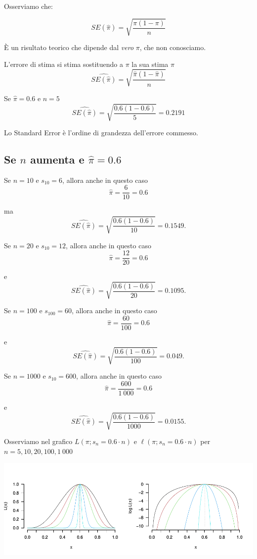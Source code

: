 \documentclass[
  11pt,
]{book}
\theoremstyle{mytheoremstyle}
\theoremstyle{mydefstyle}
\newenvironment{nota}
  {
\begin{tcolorbox}[enhanced,breakable,arc=0.1mm,boxrule=1pt,colback=white,colframe=iblue,title=\bf \fontfamily{lmss}\selectfont \faInfoCircle \hspace{.5 cm} Nota,drop fuzzy shadow]
}{
\end{tcolorbox}
  }
\begin{document}
Osserviamo che:

\begin{info}
\[SE(\hat\pi)=\sqrt{\frac{\pi(1-\pi)}{n}}\]

\end{info}

È un risultato teorico che dipende dal \emph{vero} \(\pi\), che non conosciamo.

\begin{info}
L'errore di stima si stima sostituendo a \(\pi\) la sua stima \(\hat\pi\)
\[\widehat{SE(\hat\pi)}=\sqrt{\frac{\hat\pi(1-\hat\pi)}{n}}\]

\end{info}

Se \(\hat\pi=0.6\) e \(n=5\)
\[\widehat{SE(\hat\pi)}=\sqrt{\frac{0.6(1-0.6)}{5}}=0.2191\]

\begin{nota}
Lo Standard Error è l'ordine di grandezza dell'errore commesso.

\end{nota}

\subsection{\texorpdfstring{Se \(n\) aumenta e \(\hat\pi=0.6\)}{Se n aumenta e \textbackslash hat\textbackslash pi=0.6}}\label{se-n-aumenta-e-hatpi0.6}

Se \(n=10\) e \(s_{10}=6\), allora anche in questo caso
\[\hat\pi=\frac 6{10}=0.6\]

ma
\[\widehat{SE(\hat\pi)}=\sqrt{\frac{0.6(1-0.6)}{10}}=0.1549.\]

Se \(n=20\) e \(s_{10}=12\), allora anche in questo caso
\[\hat\pi=\frac {12}{20}=0.6\]

e
\[\widehat{SE(\hat\pi)}=\sqrt{\frac{0.6(1-0.6)}{20}}=0.1095.\]

Se \(n=100\) e \(s_{100}=60\), allora anche in questo caso
\[\hat\pi=\frac {60}{100}=0.6\]

e
\[\widehat{SE(\hat\pi)}=\sqrt{\frac{0.6(1-0.6)}{100}}=0.049.\]

Se \(n=1000\) e \(s_{10}=600\), allora anche in questo caso
\[\hat\pi=\frac {600}{1~000}=0.6\]

e
\[\widehat{SE(\hat\pi)}=\sqrt{\frac{0.6(1-0.6)}{1000}}=0.0155.\]

Osserviamo nel grafico \(L(\pi;s_n=0.6\cdot n)\) e \(\ell(\pi;s_n=0.6\cdot n)\) per \(n=5,10,20,100,1~000\)

\begin{center}\includegraphics{Appunti_di_Statistica_2025_files/figure-latex/12-Verosimiglianza-13-1} \end{center}
\end{document}
